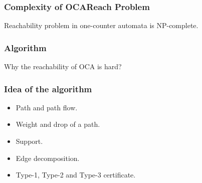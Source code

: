 \documentclass[11pt]{beamer}
\begin{document}
\begin{frame}\frametitle{Complexity of OCAReach Problem}

\begin{theorem}
Reachability problem in one-counter automata is NP-complete.
\end{theorem}

\end{frame}

\begin{frame}\frametitle{Algorithm}
Why the reachability of OCA is hard?

\end{frame}

\begin{frame}\frametitle{Idea of the algorithm}
\begin{itemize}
\item Path and path flow.
\item Weight and drop of a path.
\item Support.
\item Edge decomposition.
\item Type-1, Type-2 and Type-3 certificate.
\end{itemize}

\end{frame}
\fi
\end{document}
